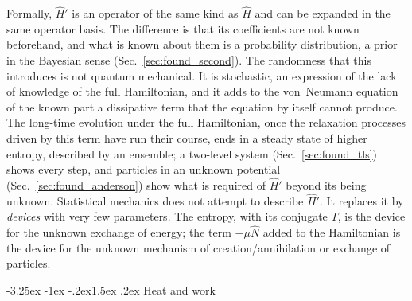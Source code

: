 \documentclass[10pt,a4paper]{article}
\makeatletter
\renewcommand{\subsection}{\@startsection{subsection}{2}{\z@}%
  {-3.25ex \@plus -1ex \@minus -.2ex}{1.5ex \@plus .2ex}%
  {\normalfont\fontsize{15.5pt}{19pt}\selectfont\bfseries}}
\makeatother
\begin{document}
Formally, $ \hat H' $ is an operator of the same kind as $ \hat H $ and can be expanded in the same operator basis.
The difference is that its coefficients are not known beforehand, and what is known about them is a probability distribution, a prior in the Bayesian sense (Sec.~\ref{sec:found_second}).
The randomness that this introduces is not quantum mechanical.
It is stochastic, an expression of the lack of knowledge of the full Hamiltonian, and it adds to the von~Neumann equation of the known part a dissipative term that the equation by itself cannot produce.
The long-time evolution under the full Hamiltonian, once the relaxation processes driven by this term have run their course, ends in a steady state of higher entropy, described by an ensemble; a two-level system (Sec.~\ref{sec:found_tls}) shows every step, and particles in an unknown potential (Sec.~\ref{sec:found_anderson}) show what is required of $ \hat H' $ beyond its being unknown.
Statistical mechanics does not attempt to describe $ \hat H' $.
It replaces it by \emph{devices} with very few parameters.
The entropy, with its conjugate $ T $, is the device for the unknown exchange of energy; the term $ -\mu\hat N $ added to the Hamiltonian is the device for the unknown mechanism of creation/annihilation or exchange of particles.

\subsection{Heat and work}
\label{sec:found_heat}
\end{document}
